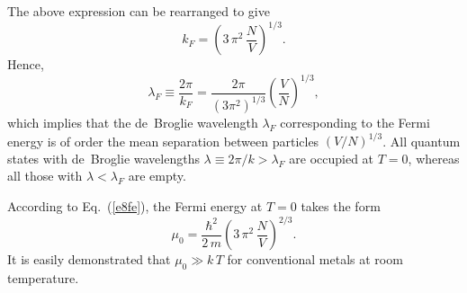 The above expression can be rearranged to
give
\begin{equation}
k_F = \left(3\,\pi^2\,\frac{N}{V}\right)^{1/3}.
\end{equation}
Hence,
\begin{equation}
\lambda_F \equiv \frac{2\pi}{k_F} =\frac{2\pi}{(3\pi^2)^{1/3}}
\left(\frac{V}{N}\right)^{1/3},
\end{equation}
which implies that the de~Broglie wavelength $\lambda_F$
corresponding to the Fermi energy is of order the mean separation
between particles $(V/N)^{1/3}$. All quantum states with de~Broglie
wavelengths $\lambda\equiv 2\pi/k > \lambda_F$ are occupied
at $T=0$, whereas all those with $\lambda<\lambda_F$ are empty.

According to Eq.~(\ref{e8fe}), the Fermi energy at $T=0$ takes the form
\begin{equation}
\mu_0 = \frac{\hbar^2}{2\,m}\left(3\,\pi^2\,\frac{N}{V}\right)^{2/3}.
\end{equation}
It is easily demonstrated that $\mu_0\gg k\,T$ for conventional metals
at room temperature.

